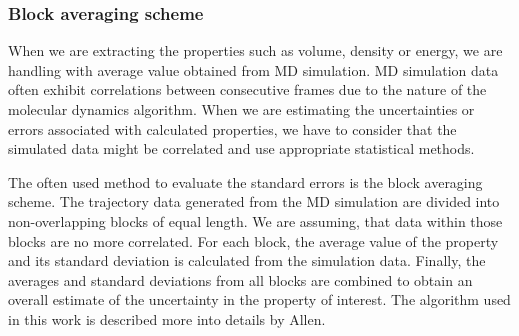 \subsubsection{Block averaging scheme}
When we are extracting the properties such as volume, density or energy, we are handling with average value obtained from MD simulation. MD simulation data often exhibit correlations between consecutive frames due to the nature of the molecular dynamics algorithm. When we are estimating the uncertainties or errors associated with calculated properties, we have to consider that the simulated data might be correlated and use appropriate statistical methods. 

The often used method to evaluate the standard errors is the block averaging scheme. The trajectory data generated from the MD simulation are divided into non-overlapping blocks of equal length. We are assuming, that data within those blocks are no more correlated. For each block, the average value of the property and its standard deviation is calculated from the simulation data. Finally, the averages and standard deviations from all blocks are combined to obtain an overall estimate of the uncertainty in the property of interest. The algorithm used in this work is described more into details by Allen.  \cite{allen_computer_2017}


